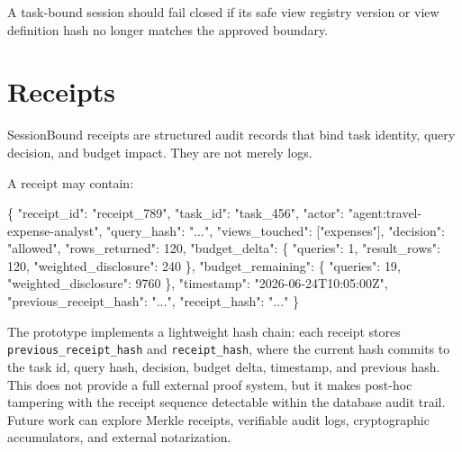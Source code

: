 \documentclass[journal]{IEEEtran}
\newenvironment{Shaded}{}{}
\newcommand{\DataTypeTok}[1]{\textcolor[rgb]{0.56,0.13,0.00}{#1}}
\newcommand{\DecValTok}[1]{\textcolor[rgb]{0.25,0.63,0.44}{#1}}
\newcommand{\FunctionTok}[1]{\textcolor[rgb]{0.02,0.16,0.49}{#1}}
\newcommand{\OtherTok}[1]{\textcolor[rgb]{0.00,0.44,0.13}{#1}}
\newcommand{\StringTok}[1]{\textcolor[rgb]{0.25,0.44,0.63}{#1}}
\begin{document}
A task-bound session should fail closed if its safe view registry
version or view definition hash no longer matches the approved boundary.


\hypertarget{receipts}{%
\section{Receipts}\label{receipts}}

SessionBound receipts are structured audit records that bind task
identity, query decision, and budget impact. They are not merely logs.

A receipt may contain:

\begin{Shaded}
\begin{Highlighting}[]
\FunctionTok{\{}
  \DataTypeTok{"receipt\_id"}\FunctionTok{:} \StringTok{"receipt\_789"}\FunctionTok{,}
  \DataTypeTok{"task\_id"}\FunctionTok{:} \StringTok{"task\_456"}\FunctionTok{,}
  \DataTypeTok{"actor"}\FunctionTok{:} \StringTok{"agent:travel{-}expense{-}analyst"}\FunctionTok{,}
  \DataTypeTok{"query\_hash"}\FunctionTok{:} \StringTok{"..."}\FunctionTok{,}
  \DataTypeTok{"views\_touched"}\FunctionTok{:} \OtherTok{[}\StringTok{"expenses"}\OtherTok{]}\FunctionTok{,}
  \DataTypeTok{"decision"}\FunctionTok{:} \StringTok{"allowed"}\FunctionTok{,}
  \DataTypeTok{"rows\_returned"}\FunctionTok{:} \DecValTok{120}\FunctionTok{,}
  \DataTypeTok{"budget\_delta"}\FunctionTok{:} \FunctionTok{\{}
    \DataTypeTok{"queries"}\FunctionTok{:} \DecValTok{1}\FunctionTok{,}
    \DataTypeTok{"result\_rows"}\FunctionTok{:} \DecValTok{120}\FunctionTok{,}
    \DataTypeTok{"weighted\_disclosure"}\FunctionTok{:} \DecValTok{240}
  \FunctionTok{\},}
  \DataTypeTok{"budget\_remaining"}\FunctionTok{:} \FunctionTok{\{}
    \DataTypeTok{"queries"}\FunctionTok{:} \DecValTok{19}\FunctionTok{,}
    \DataTypeTok{"weighted\_disclosure"}\FunctionTok{:} \DecValTok{9760}
  \FunctionTok{\},}
  \DataTypeTok{"timestamp"}\FunctionTok{:} \StringTok{"2026{-}06{-}24T10:05:00Z"}\FunctionTok{,}
  \DataTypeTok{"previous\_receipt\_hash"}\FunctionTok{:} \StringTok{"..."}\FunctionTok{,}
  \DataTypeTok{"receipt\_hash"}\FunctionTok{:} \StringTok{"..."}
\FunctionTok{\}}
\end{Highlighting}
\end{Shaded}

The prototype implements a lightweight hash chain: each receipt stores
\texttt{previous\_receipt\_hash} and
\texttt{receipt\_hash}, where the current hash commits to the task id,
query hash, decision, budget delta, timestamp, and previous hash. This
does not provide a full external proof system, but it makes post-hoc
tampering with the receipt sequence detectable within the database audit
trail. Future work can explore Merkle receipts, verifiable audit logs,
cryptographic accumulators, and external notarization.
\end{document}
